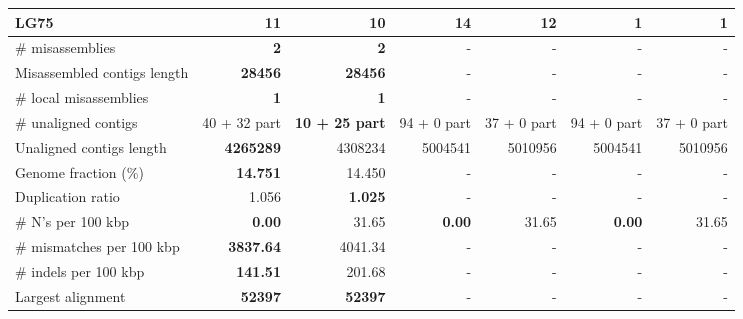 \documentclass[12pt,a4paper]{article}
\begin{document}
\begin{table}[ht]
\begin{center}
\begin{tabular}{|l*{6}{|r}|}
LG75 & 11 & 10 & 14 & 12 & {\bf 1} & {\bf 1} \\ \hline
\# misassemblies & {\bf 2} & {\bf 2} & - & - & - & - \\ \hline
Misassembled contigs length & {\bf 28456} & {\bf 28456} & - & - & - & - \\ \hline
\# local misassemblies & {\bf 1} & {\bf 1} & - & - & - & - \\ \hline
\# unaligned contigs & 40 + 32 part & {\bf 10 + 25 part} & 94 + 0 part & 37 + 0 part & 94 + 0 part & 37 + 0 part \\ \hline
Unaligned contigs length & {\bf 4265289} & 4308234 & 5004541 & 5010956 & 5004541 & 5010956 \\ \hline
Genome fraction (\%) & {\bf 14.751} & 14.450 & - & - & - & - \\ \hline
Duplication ratio & 1.056 & {\bf 1.025} & - & - & - & - \\ \hline
\# N's per 100 kbp & {\bf 0.00} & 31.65 & {\bf 0.00} & 31.65 & {\bf 0.00} & 31.65 \\ \hline
\# mismatches per 100 kbp & {\bf 3837.64} & 4041.34 & - & - & - & - \\ \hline
\# indels per 100 kbp & {\bf 141.51} & 201.68 & - & - & - & - \\ \hline
Largest alignment & {\bf 52397} & {\bf 52397} & - & - & - & - \\ \hline
\end{tabular}
\end{center}
\end{table}
\end{document}
